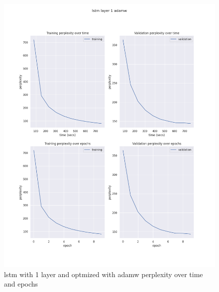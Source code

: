 \documentclass[12pt]{article}
\theoremstyle{definition}
\begin{document}
\begin{figure}[H]
     \centering
     \includegraphics[scale=0.4]{lstm_layer_1_adamw.png}
     \caption{lstm with 1 layer and optmized with adamw perplexity over time and epochs}
\end{figure}
\end{document}
